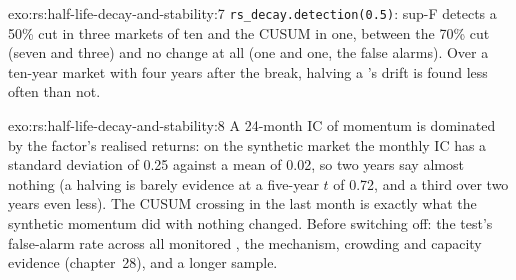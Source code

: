 \begin{solution}{exo:rs:half-life-decay-and-stability:7}
\texttt{rs\_decay.detection(0.5)}: sup-F detects a 50\% cut in three markets of ten and the CUSUM in one, between the 70\% cut (seven and three)
and no change at all (one and one, the false alarms). Over a ten-year market with four years after the break, halving a 's drift is found
less often than not.
\end{solution}

\begin{solution}{exo:rs:half-life-decay-and-stability:8}
A 24-month IC of momentum is dominated by the factor's realised returns: on the synthetic market the monthly IC has a standard deviation of 0.25
against a mean of 0.02, so two years say almost nothing (a halving is barely evidence at a five-year $t$ of 0.72, and a third over two years even
less). The CUSUM crossing in the last month is exactly what the synthetic momentum did with nothing changed. Before switching off: the test's
false-alarm rate across all monitored , the mechanism, crowding and capacity evidence (chapter~28), and a longer sample.
\end{solution}

